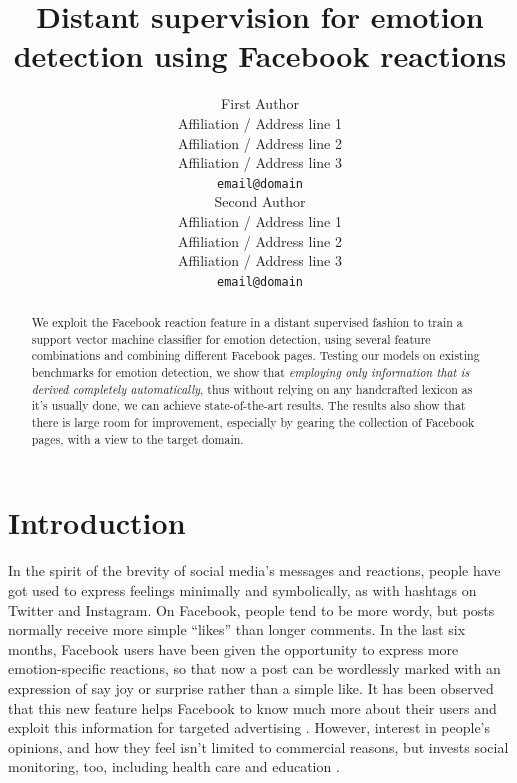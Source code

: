 \documentclass[11pt]{article}
\title{Distant supervision for emotion detection using Facebook reactions}
\author{First Author \\
  Affiliation / Address line 1 \\
  Affiliation / Address line 2 \\
  Affiliation / Address line 3 \\
  {\tt email@domain} \\\And
  Second Author \\
  Affiliation / Address line 1 \\
  Affiliation / Address line 2 \\
  Affiliation / Address line 3 \\
  {\tt email@domain} \\}
\date{}
\begin{document}
\maketitle
\begin{abstract}

We exploit the Facebook reaction feature in a distant supervised fashion to train a support vector machine classifier for emotion detection, using several feature combinations and combining different Facebook pages. Testing our models on existing benchmarks for emotion detection, we show that \textit{employing only information that is derived completely automatically}, thus without relying on any handcrafted lexicon as it's usually done, we can achieve state-of-the-art results. The results also show that there is large room for improvement, especially by gearing the collection of Facebook pages, with a view to the target domain. 

\end{abstract}





\section{Introduction}

In the spirit of the brevity of social media's messages and reactions, people have got used to express feelings minimally and symbolically, as with hashtags on Twitter and Instagram. On Facebook, people tend to be more wordy, but posts normally receive more simple ``likes'' than longer comments. In the last six months, Facebook users have been given the opportunity to express more emotion-specific reactions, so that now a post can be wordlessly marked with an expression of say joy or surprise rather than a simple like. It has been observed that this new feature helps Facebook to know much more about their users and exploit this information for targeted advertising \cite{wired}.  However, interest in people's opinions, and how they feel isn't limited to commercial reasons, but invests social monitoring, too, including health care and education \cite{SentimentEmotionSurvey2015}. 




\end{document}
